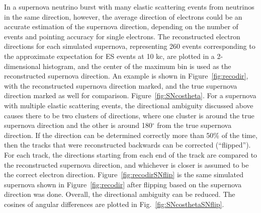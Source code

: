 In a supernova neutrino burst with many elastic scattering events from neutrinos in the same direction, however, the average direction of electrons could be an accurate estimation of the supernova direction, depending on the number of events and pointing accuracy for single electrons.
The reconstructed electron directions for each simulated supernova,
representing 260 events corresponding to the approximate expectation
for ES events at 10 kc, are plotted in a 2-dimensional histogram, and
the center of the maximum bin is used as the reconstructed supernova
direction. An example is shown in Figure~\ref{fig:recodir}, with the
reconstructed supernova direction marked, and the true supernova
direction marked as well for comparison.
Figure~\ref{fig:SNcostheta}.
For a supernova with multiple elastic scattering events, the
directional ambiguity discussed above causes there to be two clusters
of directions, where one cluster is around the true supernova
direction and the other is around 180$^{\circ}$ from the true
supernova direction.
If the direction can be determined correctly more than 50\% of the
time, then the tracks that were reconstructed backwards can be
corrected (``flipped''). For each track, the directions starting from
each end of the track are compared to the reconstructed supernova
direction, and whichever is closer is assumed to be the correct
electron direction. Figure~\ref{fig:recodirSNflip} is the same
simulated supernova shown in Figure~\ref{fig:recodir} after flipping
based on the supernova direction was done.  Overall, the directional
ambiguity can be reduced.
The cosines of angular differences are plotted in
Fig.~\ref{fig:SNcosthetaSNflip}.

